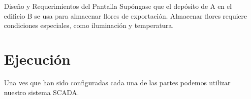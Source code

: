 Diseño y Requerimientos del Pantalla
Supóngase que el depósito de A en el edificio B se usa para almacenar flores de
exportación. Almacenar flores requiere condiciones especiales, como iluminación y
temperatura. 


\section{Ejecución}
\label{sec:Ejecucion}

Una ves que han sido configuradas cada una de las partes podemos utilizar nuestro sistema SCADA.

